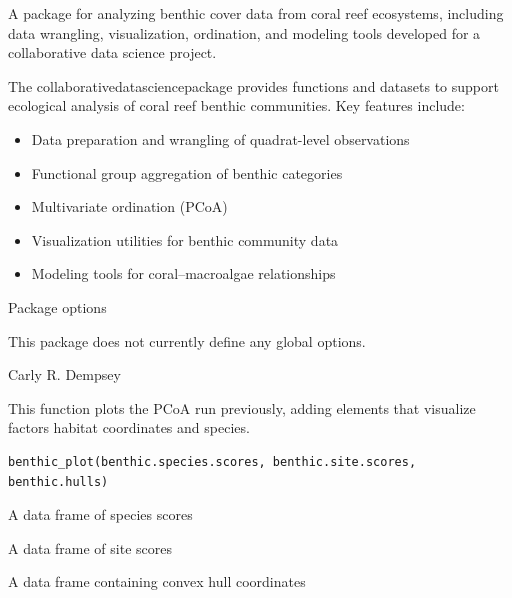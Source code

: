 \documentclass[a4paper]{book}
\begin{document}
%
\begin{Description}
A package for analyzing benthic cover data from coral reef ecosystems,
including data wrangling, visualization, ordination, and modeling tools
developed for a collaborative data science project.
\end{Description}
%
\begin{Details}
The collaborativedatasciencepackage provides functions and datasets
to support ecological analysis of coral reef benthic communities.
Key features include:

\begin{itemize}

\item{} Data preparation and wrangling of quadrat-level observations
\item{} Functional group aggregation of benthic categories
\item{} Multivariate ordination (PCoA)
\item{} Visualization utilities for benthic community data
\item{} Modeling tools for coral–macroalgae relationships

\end{itemize}

\end{Details}
%
\begin{Section}{Package options}

This package does not currently define any global options.
\end{Section}
%
\begin{Author}
Carly R. Dempsey
\end{Author}
%
\begin{Description}
This function plots the PCoA run previously, adding elements that visualize factors habitat coordinates and species.
\end{Description}
%
\begin{Usage}
\begin{verbatim}
benthic_plot(benthic.species.scores, benthic.site.scores, benthic.hulls)
\end{verbatim}
\end{Usage}
%
\begin{Arguments}
\begin{ldescription}
\item[\code{benthic.species.scores}] A data frame of species scores

\item[\code{benthic.site.scores}] A data frame of site scores

\item[\code{benthic.hulls}] A data frame containing convex hull coordinates
\end{ldescription}
\end{Arguments}
\end{document}
